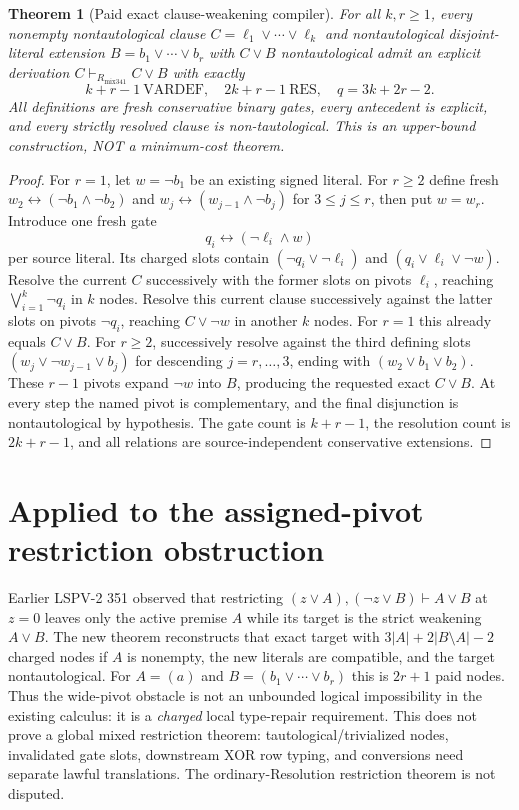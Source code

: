 \documentclass[11pt]{article}
\newtheorem{theorem}{Theorem}
\begin{document}
\begin{theorem}[Paid exact clause-weakening compiler]
For all $k,r\ge1$, every nonempty nontautological clause $C=\ell_1\vee\cdots\vee\ell_k$ and nontautological disjoint-literal extension $B=b_1\vee\cdots\vee b_r$ with $C\vee B$ nontautological admit an explicit derivation $C\vdash_{R_{\mathrm{mix341}}}C\vee B$ with exactly
\[
\boxed{k+r-1\ \mathrm{VARDEF},\quad 2k+r-1\ \mathrm{RES},\quad q=3k+2r-2.}
\]
All definitions are fresh conservative binary gates, every antecedent is explicit, and every strictly resolved clause is non-tautological. This is an upper-bound construction, NOT a minimum-cost theorem.
\end{theorem}
\begin{proof}
For $r=1$, let $w=\neg b_1$ be an existing signed literal. For $r\ge2$ define fresh $w_2\leftrightarrow(\neg b_1\land\neg b_2)$ and $w_j\leftrightarrow(w_{j-1}\land\neg b_j)$ for $3\le j\le r$, then put $w=w_r$. Introduce one fresh gate
\[
q_i\leftrightarrow(\neg\ell_i\land w)
\]
per source literal. Its charged slots contain $(\neg q_i\vee\neg\ell_i)$ and $(q_i\vee\ell_i\vee\neg w)$. Resolve the current $C$ successively with the former slots on pivots $\ell_i$, reaching $\bigvee_{i=1}^k\neg q_i$ in $k$ nodes. Resolve this current clause successively against the latter slots on pivots $\neg q_i$, reaching $C\vee\neg w$ in another $k$ nodes. For $r=1$ this already equals $C\vee B$. For $r\ge2$, successively resolve against the third defining slots $(w_j\vee\neg w_{j-1}\vee b_j)$ for descending $j=r,\ldots,3$, ending with $(w_2\vee b_1\vee b_2)$. These $r-1$ pivots expand $\neg w$ into $B$, producing the requested exact $C\vee B$. At every step the named pivot is complementary, and the final disjunction is nontautological by hypothesis. The gate count is $k+r-1$, the resolution count is $2k+r-1$, and all relations are source-independent conservative extensions.
\end{proof}

\section*{Applied to the assigned-pivot restriction obstruction}
Earlier LSPV-2 351 observed that restricting $(z\vee A),(\neg z\vee B)\vdash A\vee B$ at $z=0$ leaves only the active premise $A$ while its target is the strict weakening $A\vee B$. The new theorem reconstructs that exact target with $3|A|+2|B\setminus A|-2$ charged nodes if $A$ is nonempty, the new literals are compatible, and the target nontautological. For $A=(a)$ and $B=(b_1\vee\cdots\vee b_r)$ this is $2r+1$ paid nodes. Thus the wide-pivot obstacle is not an unbounded logical impossibility in the existing calculus: it is a \emph{charged} local type-repair requirement. This does not prove a global mixed restriction theorem: tautological/trivialized nodes, invalidated gate slots, downstream XOR row typing, and conversions need separate lawful translations. The ordinary-Resolution restriction theorem is not disputed.
\end{document}
